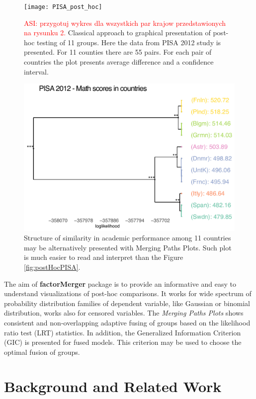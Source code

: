 \documentclass[12pt]{article}
\newcommand{\factorMerger}{\textbf{factorMerger }}
\newcommand{\todo}{\textcolor{red}}
\begin{document}
\begin{figure}[h!tbp]
\centering
\texttt{[image: PISA\_post\_hoc]}
\caption{\label{fig:postHocPISA}\todo{ASI: przygotuj wykres dla wszystkich par krajow przedstawionych na rysunku 2.} Classical approach to graphical presentation of post-hoc testing of 11 groups. Here the data from PISA 2012 study is presented. For 11 counties there are 55 pairs. For each pair of countries the plot presents average difference and a confidence interval.}
\includegraphics[scale=0.6]{FM_tukey_done2}
\caption{\label{fig:FMtukeydone2}Structure of similarity in academic performance among 11 countries may be alternatively presented with Merging Paths Plots. Such plot is much easier to read and interpret than the Figure \ref{fig:postHocPISA}.}
\end{figure}

\clearpage

The aim of \factorMerger package is to provide an informative and easy to understand visualizations of post-hoc comparisons. 
It works for wide spectrum of probability distribution families of dependent variable, like Gaussian or binomial distribution, works also for censored variables. 
The \emph{Merging Paths Plots} shows consistent and non-overlapping adaptive fusing of groups based on the likelihood ratio test (LRT) statistics. 
In addition, the Generalized Information Criterion (GIC) is presented for fused models. This criterion may be used to choose the optimal fusion of groups. 

\section{Background and Related Work}
\end{document}
